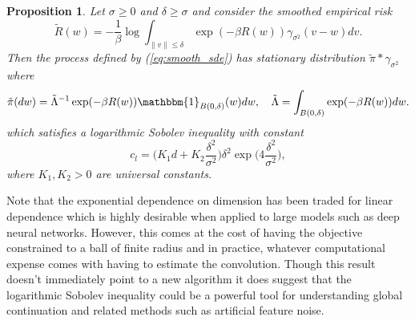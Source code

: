 \documentclass{article}
\newtheorem{proposition}[theorem]{Proposition}
\begin{document}
\begin{proposition}
Let \(\sigma \geq 0\) and \(\delta \geq \sigma\) and consider the smoothed empirical risk
\begin{equation*}
    \tilde{R}(w) = - \frac{1}{\beta} \log \int_{\|v\| \leq \delta} \exp(-\beta R(w)) \gamma_{\sigma^2}(v-w)dv.
\end{equation*}
Then the process defined by (\ref{eq:smooth_sde}) has stationary distribution \(\tilde{\pi} * \gamma_{\sigma^2}\) where
\begin{equation*}
    \tilde{\pi}(dw) = \tilde{\Lambda}^{-1} \exp(-\beta R(w)) \mathbbm{1}_{B(0, \delta)}(w) dw, \quad \tilde{\Lambda} = \int_{B(0, \delta)} \exp(-\beta R(w)) dw.
\end{equation*}
which satisfies a logarithmic Sobolev inequality with constant
\begin{equation*}
    c_l = \bigg ( K_1 d + K_2 \frac{\delta^2}{\sigma^2} \bigg ) \delta^2 \exp \bigg ( 4 \frac{\delta^2}{\sigma^2} \bigg ),
\end{equation*}
where \(K_1, K_2 > 0\) are universal constants.
\end{proposition}

Note that the exponential dependence on dimension has been traded for linear dependence which is highly desirable when applied to large models such as deep neural networks. However, this comes at the cost of having the objective constrained to a ball of finite radius and in practice, whatever computational expense comes with having to estimate the convolution. Though this result doesn't immediately point to a new algorithm it does suggest that the logarithmic Sobolev inequality could be a powerful tool for understanding global continuation and related methods such as artificial feature noise.




\newpage
\end{document}
